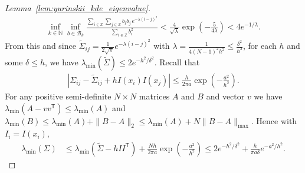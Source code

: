 \documentclass[11pt,lof]{puthesis}
\newcommand{\N}{\ensuremath{\mathbb{N}}}
\newcommand{\Z}{\ensuremath{\mathbb{Z}}}
\newcommand{\cB}{\ensuremath{\mathcal{B}}}
\newcommand{\T}{\ensuremath{\mathsf{T}}}
\theoremstyle{break}
\theoremstyle{proof}
\newtheorem{proof}{Proof}
\begin{document}
\begin{proof}[Lemma~\ref{lem:yurinskii_kde_eigenvalue}]
\begin{align*}
    \inf_{k \in \N}
    \inf_{b \in \cB_k}
    \frac{\sum_{i \in \Z} \sum_{j \in \Z} b_i b_j \, e^{-\lambda(i-j)^2}}
    {\sum_{i \in \Z} b_i^2}
    < \frac{4}{\sqrt \lambda}
    \exp \left( - \frac{5}{4 \lambda} \right)
    < 4 e^{-1/\lambda}.
  \end{align*}
  From this and since
  $\tilde\Sigma_{i j} = \frac{1}{2 \sqrt \pi} e^{-\lambda(i-j)^2}$
  with $\lambda = \frac{1}{4(N-1)^2 h^2} \leq \frac{\delta^2}{h^2}$,
  for each $h$ and some $\delta \leq h$,
  we have $\lambda_{\min}(\tilde\Sigma) \leq 2 e^{-h^2/\delta^2}$.
  Recall that
  \begin{align*}
    \left|
    \Sigma_{i j}
    - \tilde\Sigma_{i j}
    + h I(x_i) I(x_j)
    \right|
    \leq
    \frac{h}{2 \pi a}
    \exp \left(- \frac{a^2}{h^2}\right).
  \end{align*}
  For any positive semi-definite $N \times N$ matrices $A$ and $B$
  and vector $v$ we have $\lambda_{\min}(A - v v^\T) \leq \lambda_{\min}(A)$
  and $\lambda_{\min}(B) \leq \lambda_{\min}(A) + \|B-A\|_2
  \leq \lambda_{\min}(A) + N \|B-A\|_{\max}$.
  Hence with $I_i = I(x_i)$,
  \begin{align*}
    \lambda_{\min}(\Sigma)
    &\leq
    \lambda_{\min}(\tilde\Sigma - h I I^\T)
    + \frac{N h}{2 \pi a}
    \exp \left(- \frac{a^2}{h^2}\right)
    \leq
    2 e^{-h^2/\delta^2}
    + \frac{h}{\pi a \delta}
    e^{-a^2 / h^2}.
  \end{align*}
\end{proof}
\end{document}
